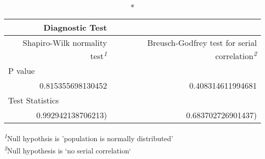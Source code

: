 \setlength{\LTpost}{0mm}
\begin{longtable}{rr}
\caption*{
{\large Diagnostic Test}
} \\ 
\toprule
Shapiro-Wilk normality test\textsuperscript{\textit{1}} & Breusch-Godfrey test for serial correlation\textsuperscript{\textit{2}} \\ 
\midrule
\multicolumn{2}{l}{P value} \\ 
\midrule
0.815355698130452 & 0.408314611994681 \\ 
\midrule
\multicolumn{2}{l}{Test Statistics} \\ 
0.992942138706213) & 0.683702726901437) \\ 
\bottomrule
\end{longtable}
\begin{minipage}{\linewidth}
\textsuperscript{\textit{1}}Null hypothsis is 'population is normally distributed'\\
\textsuperscript{\textit{2}}Null hypothesis is `no serial correlation`\\
\end{minipage}

